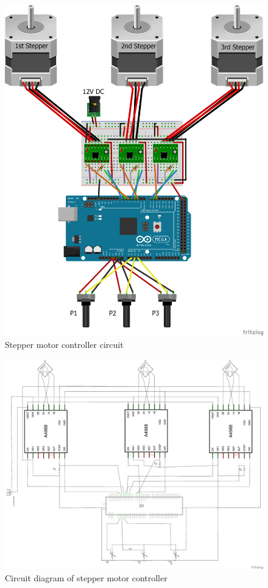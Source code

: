 \begin{figure}[H]
	\centering
	\includegraphics[width=\maxwidth{15cm}, keepaspectratio]{Chapters/Fig/stepper_coltroler_circuit.png}
	\caption{Stepper motor controller circuit}
	\label{fig:stepper_coltroler_circuit}
\end{figure}

\begin{figure}[H]
	\centering
	\includegraphics[width=\maxwidth{15cm}, keepaspectratio]{Chapters/Fig/stepper_coltroler_circuit_schem.png}
	\caption{Circuit diagram of stepper motor controller}
	\label{fig:stepper_coltroler_circuit_schem}
\end{figure}

